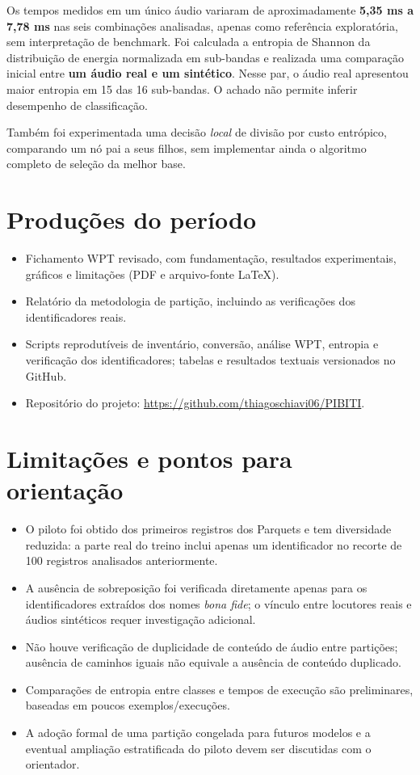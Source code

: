\documentclass[11pt,a4paper]{article}
\begin{document}
Os tempos medidos em um único áudio variaram de aproximadamente \textbf{5,35 ms a 7,78 ms} nas seis combinações analisadas, apenas como referência exploratória, sem interpretação de benchmark. Foi calculada a entropia de Shannon da distribuição de energia normalizada em sub-bandas e realizada uma comparação inicial entre \textbf{um áudio real e um sintético}. Nesse par, o áudio real apresentou maior entropia em 15 das 16 sub-bandas. O achado não permite inferir desempenho de classificação.

Também foi experimentada uma decisão \emph{local} de divisão por custo entrópico, comparando um nó pai a seus filhos, sem implementar ainda o algoritmo completo de seleção da melhor base.
\section{Produções do período}
\begin{itemize}
\item Fichamento WPT revisado, com fundamentação, resultados experimentais, gráficos e limitações (PDF e arquivo-fonte LaTeX).
\item Relatório da metodologia de partição, incluindo as verificações dos identificadores reais.
\item Scripts reprodutíveis de inventário, conversão, análise WPT, entropia e verificação dos identificadores; tabelas e resultados textuais versionados no GitHub.
\item Repositório do projeto: \url{https://github.com/thiagoschiavi06/PIBITI}.
\end{itemize}
\section{Limitações e pontos para orientação}
\begin{itemize}
\item O piloto foi obtido dos primeiros registros dos Parquets e tem diversidade reduzida: a parte real do treino inclui apenas um identificador no recorte de 100 registros analisados anteriormente.
\item A ausência de sobreposição foi verificada diretamente apenas para os identificadores extraídos dos nomes \emph{bona fide}; o vínculo entre locutores reais e áudios sintéticos requer investigação adicional.
\item Não houve verificação de duplicidade de conteúdo de áudio entre partições; ausência de caminhos iguais não equivale a ausência de conteúdo duplicado.
\item Comparações de entropia entre classes e tempos de execução são preliminares, baseadas em poucos exemplos/execuções.
\item A adoção formal de uma partição congelada para futuros modelos e a eventual ampliação estratificada do piloto devem ser discutidas com o orientador.
\end{itemize}
\end{document}
